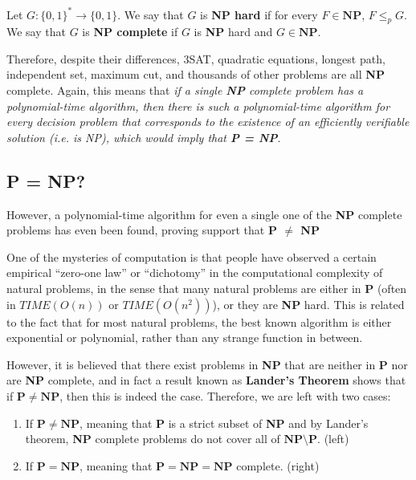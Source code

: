 \documentclass{article}
\begin{document}
  \begin{definition}
  Let $G: \{0,1\}^* \longrightarrow \{0,1\}$. We say that $G$ is \textbf{NP hard} if for every $F \in \mathbf{NP}$, $F \leq_p G$. We say that $G$ is \textbf{NP complete} if $G$ is \textbf{NP} hard and $G \in \mathbf{NP}$. 
  \end{definition}

  Therefore, despite their differences, 3SAT, quadratic equations, longest path, independent set, maximum cut, and thousands of other problems are all \textbf{NP} complete. Again, this means that \textit{if a single \textbf{NP} complete problem has a polynomial-time algorithm, then there is such a polynomial-time algorithm for every decision problem that corresponds to the existence of an efficiently verifiable solution (i.e. is NP), which would imply that \textbf{P = NP}}.

  \subsection{P = NP?}
  However, a polynomial-time algorithm for even a single one of the \textbf{NP} complete problems has even been found, proving support that \textbf{P $\neq$ NP}

  One of the mysteries of computation is that people have observed a certain empirical “zero-one law” or “dichotomy” in the computational complexity of natural problems, in the sense that many natural problems are either in \textbf{P} (often in $TIME(O(n))$ or $TIME(O(n^2))$), or they are \textbf{NP} hard. This is related to the fact that for most natural problems, the best known algorithm is either exponential or polynomial, rather than any strange function in between. 

  However, it is believed that there exist problems in \textbf{NP} that are neither in \textbf{P} nor are \textbf{NP} complete, and in fact a result known as \textbf{Lander's Theorem} shows that if $\mathbf{P \neq NP}$, then this is indeed the case. Therefore, we are left with two cases:
  \begin{enumerate}
      \item If $\mathbf{P} \neq \mathbf{NP}$, meaning that \textbf{P} is a strict subset of \textbf{NP} and by Lander's theorem, \textbf{NP} complete problems do not cover all of $\mathbf{NP} \setminus \mathbf{P}$. (left)
      \item If $\mathbf{P} = \mathbf{NP}$, meaning that $\mathbf{P} = \mathbf{NP} = \mathbf{NP}$ complete. (right)
  \end{enumerate}
  \begin{center}
  \end{center}
\end{document}
